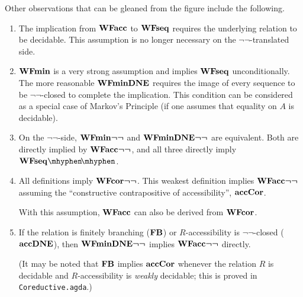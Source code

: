 Other observations that can be gleaned from the figure include the following.
\begin{enumerate}
  \item The implication from $\mathbf{WFacc}$ to $\mathbf{WFseq}$ requires the underlying relation to be decidable. %
    This assumption is no longer necessary on the $\lnot\lnot$-translated side.
  \item $\mathbf{WFmin}$ is a very strong assumption and implies $\mathbf{WFseq}$ unconditionally.
  The more reasonable $\mathbf{WFminDNE}$ requires the image of every sequence to be $\lnot\lnot$-closed
  to complete the implication.  This condition can be considered as a special case of Markov's Principle
  (if one assumes that equality on $A$ is decidable).
  \item On the $\lnot\lnot$-side, $\mathbf{WFmin}\boldsymbol{\lnot\lnot}$ and $\mathbf{WFminDNE}\boldsymbol{\lnot\lnot}$ are equivalent. Both are directly implied by $\mathbf{WFacc}\boldsymbol{\lnot\lnot}$,
    and all three directly imply $\WFseqm$.
  \item All definitions imply $\mathbf{WFcor}\boldsymbol{\lnot\lnot}$.  This weakest definition implies $\mathbf{WFacc}\boldsymbol{\lnot\lnot}$ assuming the
    ``constructive contrapositive of accessibility'', $\mathbf{accCor}$.

    With this assumption, $\mathbf{WFacc}$ can also be derived from $\mathbf{WFcor}$. %


  \item If the relation is finitely branching ($\mathbf{FB}$) or $R$-accessibility is $\lnot\lnot$-closed ($\mathbf{accDNE}$), then $\mathbf{WFminDNE}\boldsymbol{\lnot\lnot}$
    implies $\mathbf{WFacc}\boldsymbol{\lnot\lnot}$ directly.

    (It may be noted that $\mathbf{FB}$ implies $\mathbf{accCor}$ whenever the relation $R$ is decidable
    and $R$-accessibility is \emph{weakly} decidable;  this is proved in \texttt{Coreductive.agda}.)


\end{enumerate}

